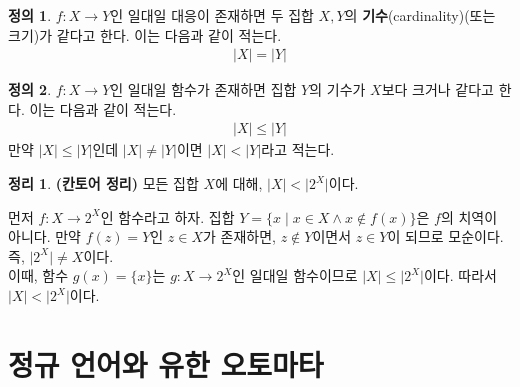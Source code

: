 \documentclass[b5paper]{book}
\theoremstyle{definition}
\newtheorem{defn}{정의}[chapter]
\newtheorem{thm}{정리}[chapter]
\newenvironment{pf*}{\pushQED{\qed}\pf}{\popQED\endpf}
\begin{document}
\begin{defn}
    $f: X \rightarrow Y$인 일대일 대응이 존재하면
    두 집합 $X, Y$의 \textbf{기수}(cardinality)(또는 크기)가 같다고 한다.
     이는 다음과 같이 적는다.
    \begin{align*}
        \vert X \vert = \vert Y \vert
    \end{align*}
\end{defn}
\begin{defn}
    $f: X \rightarrow Y$인 일대일 함수가
    존재하면 집합 $Y$의 기수가 $X$보다 크거나 같다고 한다. 이는 다음과 같이 적는다.
    \begin{align*}
        \vert X \vert \le \vert Y \vert
    \end{align*} 
    만약 $\vert X \vert \le \vert Y \vert$인데 $\vert X \vert \neq \vert Y \vert$이면
    $\vert X \vert < \vert Y \vert$라고 적는다.
\end{defn}
\begin{thm}
    \textbf{(칸토어 정리)} 모든 집합 $X$에 대해, $\vert X \vert < \vert 2^X \vert$이다.
\end{thm}
\begin{pf*}
    먼저 $f: X \rightarrow 2^X$인 함수라고 하자. 집합 $Y = \{x \;\vert\; x \in X \wedge
    x \notin f(x)\}$은 $f$의 치역이 아니다. 만약 $f(z) = Y$인 $z \in X$가 존재하면,
    $z \notin Y$이면서 $z \in Y$이 되므로 모순이다. 즉, $\vert 2^X \vert
    \neq X$이다. \\ 
    이때, 함수 $g(x) = \{x\}$는 $g: X \rightarrow 2^X$인 일대일 함수이므로
    $\vert X \vert \le \vert 2^X \vert$이다. 따라서 $\vert X \vert < \vert 2^X \vert$이다.
\end{pf*}
\chapter{정규 언어와 유한 오토마타} 
\end{document}
